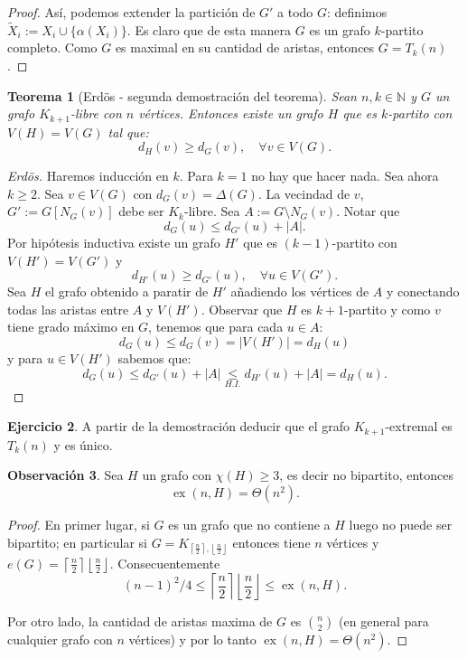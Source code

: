 \documentclass[12pt]{report}
\theoremstyle{plain}
\newtheorem{theorem}{Teorema}[section]
\theoremstyle{definition}
\newtheorem{obs}[theorem]{Observación}
\newtheorem{exercise}[theorem]{Ejercicio}
\newcommand{\naturals}{\mathbb{N}}
\newcommand{\abs}[1]{\left \vert #1 \right \vert}
\newcommand{\ceil}[1]{\left\lceil #1  \right\rceil}
\newcommand{\floor}[1]{\left\lfloor #1  \right\rfloor}
\newcommand{\ex}[2]{\operatorname{ex} (#1, #2)}
\begin{document}
\begin{proof}
Así, podemos extender la partición de $G'$ a todo $G$: definimos $\tilde X_i := X_i \cup \{\alpha (X_i)\}$. Es claro que de esta manera $G$ es un grafo $k$-partito completo. Como $G$ es maximal en su cantidad de aristas, entonces $G = T_k (n)$.
\end{proof}




\begin{theorem}[Erdös - segunda demostración del teorema]
Sean $n, k  \in \naturals    $ y $G$ un grafo $K_{k+1}$-libre con $n$ vértices. Entonces existe un grafo $H$ que es $k$-partito con $V(H) = V(G)$ tal que:
\[
    d_H (v) \geq d_G (v) , \quad \forall v \in V(G).
\]
\end{theorem}
\begin{proof}[Erdös]
Haremos inducción en $k$. Para $k = 1$ no hay que hacer nada. Sea ahora $k \geq 2$. Sea $v \in V(G)$ con $d_G (v) = \Delta (G)$. La vecindad de $v$, $G' := G[N_G (v)]$ debe ser $K_{k}$-libre. Sea $A := G \setminus N_G (v)$. Notar que
\[
    d_{G} (u) \leq d_{G'} (u) + \abs A.
\]
Por hipótesis inductiva existe un grafo $H'$ que es $(k-1)$-partito con $V(H') = V(G')$ y
\[
    d_{H'} (u) \geq d_{G'} (u), \quad \forall u \in V(G').
\]
Sea $H$ el grafo obtenido a paratir de $H'$ añadiendo los vértices de $A$ y conectando todas las aristas entre $A$ y $V(H')$. Observar que $H$ es $k+1$-partito y como $v$ tiene grado máximo en $G$, tenemos que para cada $u \in A$:
\[
    d_G (u) \leq d_G (v) = \abs{V(H')} = d_H (u)
\]
y para $u \in V(H')$ sabemos que:
\[
    d_G (u) \leq d_{G'} (u) + \abs A    \underset{H.I.}{\leq} d_{H'} (u) + \abs A = d_H (u).
\]
\end{proof}

\begin{exercise}
A partir de la demostración deducir que el grafo $K_{k+1}$-extremal es $T_k (n)$ y es único.
\end{exercise}

\begin{obs}
Sea $H$ un grafo con $\chi (H) \geq 3$, es decir no bipartito, entonces
\[
    \ex n H = \Theta (n^2).
\]
\end{obs}
\begin{proof}
En primer lugar, si $G$ es un grafo que no contiene a $H$ luego no puede ser bipartito; en particular si $G = K_{\ceil { \frac n 2} , \floor {\frac n 2}}$ entonces tiene $n$ vértices y $e(G) = \ceil { \frac n 2} \floor {\frac n 2}$. Consecuentemente
\[
    (n-1)^2/4 \leq  \ceil { \frac n 2} \floor {\frac n 2} \leq \ex n H.
\]

Por otro lado, la cantidad de aristas maxima de $G$ es $\binom n 2$ (en general para cualquier grafo con $n$ vértices) y por lo tanto $\ex n H = \Theta (n^2)$.
\end{proof}
\end{document}
